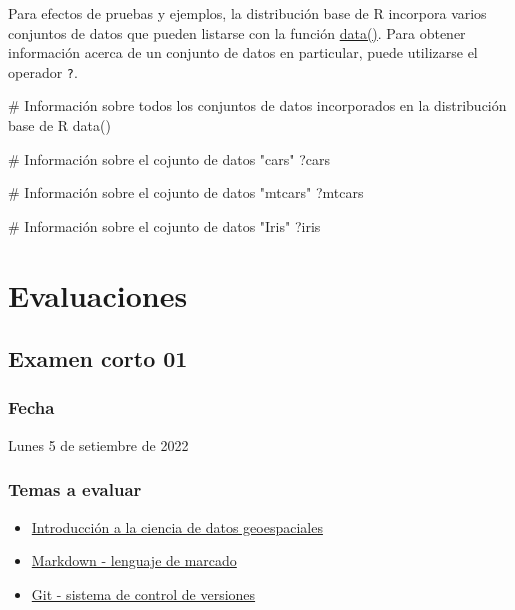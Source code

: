 \documentclass[
  letterpaper,
  DIV=11,
  numbers=noendperiod]{scrreprt}
\newenvironment{Shaded}{\begin{snugshade}}{\end{snugshade}}
\newcommand{\CommentTok}[1]{\textcolor[rgb]{0.37,0.37,0.37}{#1}}
\newcommand{\FunctionTok}[1]{\textcolor[rgb]{0.28,0.35,0.67}{#1}}
\newcommand{\NormalTok}[1]{\textcolor[rgb]{0.00,0.23,0.31}{#1}}
\providecommand{\tightlist}{%
  \setlength{\itemsep}{0pt}\setlength{\parskip}{0pt}}\usepackage{longtable,booktabs,array}
\begin{document}
Para efectos de pruebas y ejemplos, la distribución base de R incorpora
varios conjuntos de datos que pueden listarse con la función
\href{https://rdrr.io/r/utils/data.html}{data()}. Para obtener
información acerca de un conjunto de datos en particular, puede
utilizarse el operador \texttt{?}.

\begin{Shaded}
\begin{Highlighting}[]
\CommentTok{\# Información sobre todos los conjuntos de datos incorporados en la distribución base de R}
\FunctionTok{data}\NormalTok{()}

\CommentTok{\# Información sobre el cojunto de datos "cars"}
\NormalTok{?cars}

\CommentTok{\# Información sobre el cojunto de datos "mtcars"}
\NormalTok{?mtcars}

\CommentTok{\# Información sobre el cojunto de datos "Iris"}
\NormalTok{?iris}
\end{Highlighting}
\end{Shaded}

\part{Evaluaciones}

\hypertarget{examen-corto-01}{%
\chapter*{Examen corto 01}\label{examen-corto-01}}

\hypertarget{fecha}{%
\section*{Fecha}\label{fecha}}

Lunes 5 de setiembre de 2022

\hypertarget{temas-a-evaluar}{%
\section*{Temas a evaluar}\label{temas-a-evaluar}}

\begin{itemize}
\tightlist
\item
  \href{https://pf0953-programacionr.github.io/2022-ii/01-introduccion-ciencia-datos-geoespaciales.html}{Introducción
  a la ciencia de datos geoespaciales}
\item
  \href{https://pf0953-programacionr.github.io/2022-ii/02-markdown.html}{Markdown
  - lenguaje de marcado}
\item
  \href{https://pf0953-programacionr.github.io/2022-ii/03-git.html}{Git
  - sistema de control de versiones}
\end{itemize}
\end{document}
